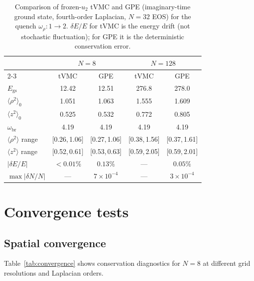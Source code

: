 \documentclass[aps,prl,onecolumn,superscriptaddress,longbibliography,nofootinbib]{revtex4-2}
\begin{document}
\begin{table}[h]
\caption{Comparison of frozen-$u_2$ tVMC and GPE (imaginary-time ground
state, fourth-order Laplacian, $N=32$ EOS) for the quench
$\omega_\rho:1\to 2$.
$\delta E/E$ for tVMC is the energy drift (not stochastic fluctuation);
for GPE it is the deterministic conservation error.}
\label{tab:results}
\begin{ruledtabular}
\begin{tabular}{lcccc}
 & \multicolumn{2}{c}{$N=8$} & \multicolumn{2}{c}{$N=128$} \\
\cline{2-3}\cline{4-5}
 & tVMC & GPE & tVMC & GPE \\
\hline
$E_{\mathrm{gs}}$
& 12.42 & 12.51 & 276.8 & 278.0 \\
$\langle\rho^2\rangle_0$
& 1.051 & 1.063 & 1.555 & 1.609 \\
$\langle z^2\rangle_0$
& 0.525 & 0.532 & 0.772 & 0.805 \\
$\omega_{\mathrm{br}}$
& 4.19 & 4.19 & 4.19 & 4.19 \\
$\langle\rho^2\rangle$ range
& [0.26,\,1.06] & [0.27,\,1.06] & [0.38,\,1.56] & [0.37,\,1.61] \\
$\langle z^2\rangle$ range
& [0.52,\,0.61] & [0.53,\,0.63] & [0.59,\,2.05] & [0.59,\,2.01] \\
$|\delta E/E|$
& $<0.01\%$ & $0.13\%$ & --- & $0.05\%$ \\
$\max|\delta N/N|$
& --- & $7\!\times\!10^{-4}$ & --- & $3\!\times\!10^{-4}$ \\
\end{tabular}
\end{ruledtabular}
\end{table}

\section{Convergence tests}
\label{sec:convergence}

\subsection{Spatial convergence}

Table~\ref{tab:convergence} shows conservation diagnostics for $N=8$
at different grid resolutions and Laplacian orders.
\end{document}
